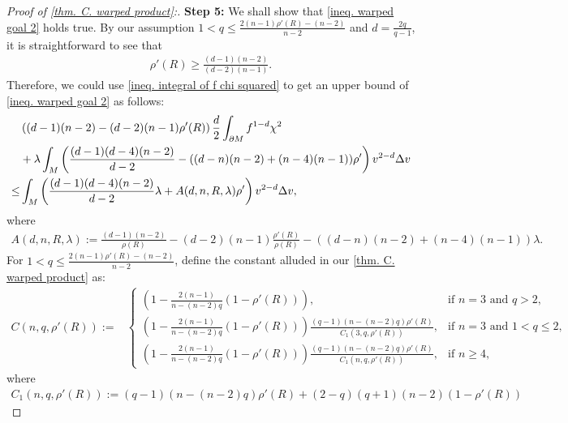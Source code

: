 \documentclass[12pt]{amsart}%
\numberwithin{equation}{section}
\numberwithin{lemma}{section}
\numberwithin{proposition}{section}
\numberwithin{corollary}{section}
\numberwithin{remark}{section}
\begin{document}
\begin{proof}[Proof of \cref{thm. C. warped product}:]
    \textbf{Step 5:} We shall show that \cref{ineq. warped goal 2} holds true. By our assumption $1<q\leq \frac{2(n-1)\rho'(R)-(n-2)}{n-2}$ and $d=\frac{2q}{q-1}$, it is straightforward to see that 
    \begin{align}\label{ineq. rho' R lower bound}
        \rho'(R)\geq\frac{(d-1)(n-2)}{(d-2)(n-1)}.
    \end{align}
    Therefore, we could use \cref{ineq. integral of f chi squared} to get an upper bound of \cref{ineq. warped goal 2} as follows:
    \begin{align}\label{ineq. upper bound of 3_23}
        &\left(
        (d-1)(n-2)-(d-2)(n-1)\rho'(R)
        \right)
        \frac{d}{2}\int_{\partial M} f^{1-d}\chi^2\notag\\
        &+\lambda
        \int_M
        \left(
        \frac{(d-1)(d-4)(n-2)}{d-2}
        -((d-n)(n-2)+(n-4)(n-1))\rho'
        \right)
        v^{2-d}\Delta v \notag\\
        \leq
        &\int_M \left(
        \frac{(d-1)(d-4)(n-2)}{d-2}\lambda
        +A(d,n,R,\lambda)\rho'\right)v^{2-d}\Delta v,
    \end{align}
    where
    \begin{align*}
        A(d,n,R,\lambda):=\frac{(d-1)(n-2)}{\rho(R)}
        -(d-2)(n-1)\frac{\rho'(R)}{\rho(R)}
        -\left(
        (d-n)(n-2)+(n-4)(n-1)
        \right)\lambda.
    \end{align*}
    For $1<q\leq \frac{2(n-1)\rho'(R)-(n-2)}{n-2}$, define the constant alluded in our \cref{thm. C. warped product} as:
    \begin{align}\label{def. C}
         C(n,q,\rho'(R))
            :=&\begin{cases}
                \left(1-\frac{2(n-1)}{n-(n-2)q}(1-\rho'(R))\right),
                &\text{if } n=3 \text{ and }  
                 q>2,\\
                \left(1-\frac{2(n-1)}{n-(n-2)q}(1-\rho'(R))\right)
                \frac{(q-1)(n-(n-2)q)\rho'(R)}{C_1(3,q,\rho'(R))},
                &\text{if } n=3 \text{ and }  
                 1<q\leq 2,\\
                \left(1-\frac{2(n-1)}{n-(n-2)q}(1-\rho'(R))\right)
                \frac{(q-1)(n-(n-2)q)\rho'(R)}{C_1(n,q,\rho'(R))},
                &\text{if } n\geq 4,
            \end{cases}
    \end{align}
    where
    \begin{align*}
        C_1(n,q,\rho'(R)):=(q-1)(n-(n-2)q)\rho'(R)+(2-q)(q+1)(n-2)(1-\rho'(R))
    \end{align*}
    

\end{proof}
\end{document}

